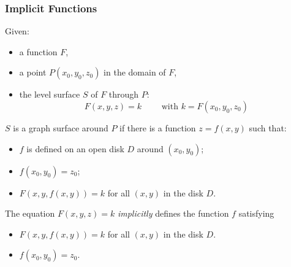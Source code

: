 \begin{frame}
\frametitle{Implicit Functions}

Given:
\begin{itemize}
  \item a function $F$,
  \item a point $P(x_0,y_0,z_0)$ in the domain of $F$,
  \item the level surface $S$ of $F$ through $P$:
  $$F(x,y,z) = k \qquad \text{ with } k=F(x_0,y_0,z_0)$$
\end{itemize}

\pause
$S$ is a graph surface around $P$ if there is a function $z=f(x,y)$ such that:
%
\begin{itemize}
  \item $f$ is defined on an open disk $D$ around $(x_0,y_0)$;
  \item $f(x_0,y_0) = z_0$;
  \item $F(x,y,f(x,y)) = k$ for all $(x,y)$ in the disk $D$.
\end{itemize}

\pause
The equation $F(x,y,z) = k$ \emph{implicitly} defines the function $f$ satisfying
%
\begin{itemize}
  \item $F(x,y,f(x,y)) = k$ for all $(x,y)$ in the disk $D$.
  \item $f(x_0,y_0) = z_0$.
\end{itemize}
\end{frame}
